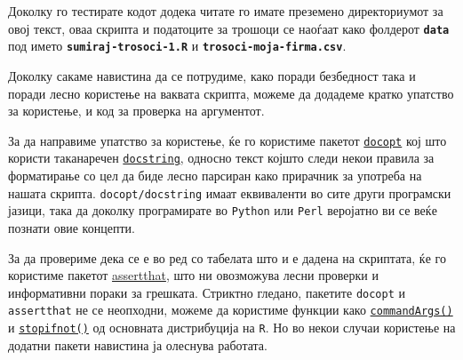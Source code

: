 \documentclass[
]{book}
\begin{document}
Доколку го тестирате кодот додека читате го имате преземено директориумот за овој текст, оваа скрипта и податоците за трошоци се наоѓаат како фолдерот \textbf{\texttt{data}} под името \textbf{\texttt{sumiraj-trosoci-1.R}} и \textbf{\texttt{trosoci-moja-firma.csv}}.

Доколку сакаме навистина да се потрудиме, како поради безбедност така и поради лесно користење на ваквата скрипта, можеме да додадеме кратко упатство за користење, и код за проверка на аргументот.

За да направиме упатство за користење, ќе го користиме пакетот \href{https://www.rdocumentation.org/packages/docopt/versions/0.7.1}{\texttt{docopt}} кој што користи таканаречен \href{https://en.wikipedia.org/wiki/Docstring}{\texttt{docstring}}, односно текст којшто следи некои правила за форматирање со цел да биде лесно парсиран како прирачник за употреба на нашата скрипта. \texttt{docopt/docstring} имаат еквиваленти во сите други програмски јазици, така да доколку програмирате во \texttt{Python} или \texttt{Perl} \citep{wall2000programming} веројатно ви се веќе познати овие концепти.

За да провериме дека се е во ред со табелата што и е дадена на скриптата, ќе го користиме пакетот \href{https://www.rdocumentation.org/packages/assertthat/versions/0.2.1}{assertthat}, што ни овозможува лесни проверки и информативни пораки за грешката. Стриктно гледано, пакетите \texttt{docopt} и \texttt{assertthat} не се неопходни, можеме да користиме функции како \href{https://www.rdocumentation.org/packages/base/versions/3.6.2/topics/commandArgs}{\texttt{commandArgs()}} и \href{https://www.rdocumentation.org/packages/base/versions/3.6.2/topics/stopifnot}{\texttt{stopifnot()}} од основната дистрибуција на \texttt{R}. Но во некои случаи користење на додатни пакети навистина ја олеснува работата.
\end{document}
